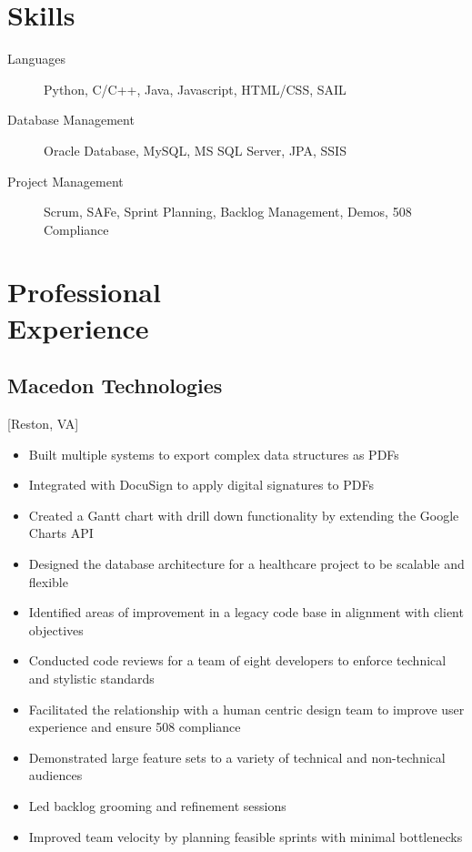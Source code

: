 \documentclass{mycv}
\begin{document}
\maketitle%

\section{Skills}

\begin{description}
  \item[Languages] Python, C/C++, Java, Javascript, HTML/CSS, SAIL
  \item[Database Management] Oracle Database, MySQL, MS SQL Server, JPA, SSIS
  \item[Project Management] Scrum, SAFe, Sprint Planning, Backlog Management, Demos, 508 \\ Compliance
\end{description}

\section{Professional \\ Experience}

\subsection{Macedon Technologies}[Reston, VA]
\begin{positions}
\end{positions}

\begin{itemize}
  \item Built multiple systems to export complex data structures as PDFs
  \item Integrated with DocuSign to apply digital signatures to PDFs
  \item Created a Gantt chart with drill down functionality by extending the Google Charts API
  \item Designed the database architecture for a healthcare project to be scalable and flexible
  \item Identified areas of improvement in a legacy code base in alignment with client objectives
  \item Conducted code reviews for a team of eight developers to enforce technical and stylistic standards
  \item Facilitated the relationship with a human centric design team to improve user experience and ensure 508 compliance
  \item Demonstrated large feature sets to a variety of technical and non-technical audiences
  \item Led backlog grooming and refinement sessions
  \item Improved team velocity by planning feasible sprints with minimal bottlenecks
\end{itemize}
\end{document}
